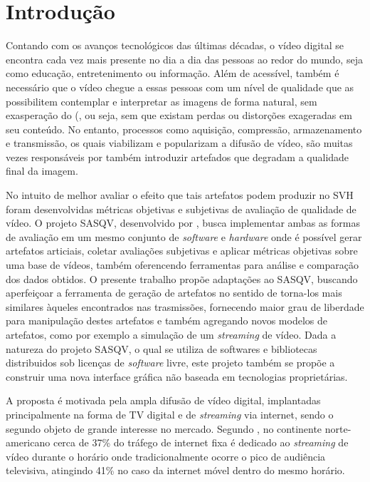 \chapter{Introdução}

Contando com os avanços tecnológicos das últimas décadas, o vídeo digital se encontra cada vez mais presente no dia a dia das pessoas ao redor do mundo, seja como educação, entretenimento ou informação.
Além de acessível, também é necessário que o vídeo chegue a essas pessoas com um nível de qualidade que as possibilitem contemplar e interpretar as imagens de forma natural, sem exasperação do (, ou seja, sem que existam perdas ou distorções exageradas em seu conteúdo.
No entanto, processos como aquisição, compressão, armazenamento e transmissão, os quais viabilizam e popularizam a difusão de vídeo, são muitas vezes responsáveis por também introduzir artefados que degradam a qualidade final da imagem\cite{daronco}.

No intuito de melhor avaliar o efeito que tais artefatos podem produzir no SVH foram desenvolvidas métricas objetivas e subjetivas de avaliação de qualidade de vídeo. O projeto SASQV, desenvolvido por \cite{sasqv}, busca implementar ambas as formas de avaliação em um mesmo conjunto de \emph{software} e \emph{hardware} onde é possível gerar artefatos articiais, coletar avaliações subjetivas e aplicar métricas objetivas sobre uma base de vídeos, também oferencendo ferramentas para análise e comparação dos dados obtidos. O presente trabalho propõe adaptações ao SASQV, buscando aperfeiçoar a ferramenta de  geração de artefatos no sentido de torna-los mais similares àqueles encontrados nas trasmissões, fornecendo maior grau de liberdade para manipulação destes artefatos e também agregando novos modelos de artefatos, como por exemplo a simulação de um \emph{streaming} de vídeo. Dada a natureza do projeto SASQV, o qual se utiliza de softwares e bibliotecas distribuidos sob licenças de \emph{software} livre, este projeto também se propõe a construir uma nova interface gráfica não baseada em tecnologias proprietárias.

A proposta é motivada pela ampla difusão de vídeo digital, implantadas principalmente na forma de TV digital e de \emph{streaming} via internet, sendo o segundo objeto de grande interesse no mercado. Segundo \cite{sandvinereport}, no continente norte-americano cerca de 37\% do tráfego de internet fixa é dedicado ao \emph{streaming} de vídeo durante o horário onde tradicionalmente ocorre o pico de audiência televisiva, atingindo 41\% no caso da internet móvel dentro do mesmo horário.

